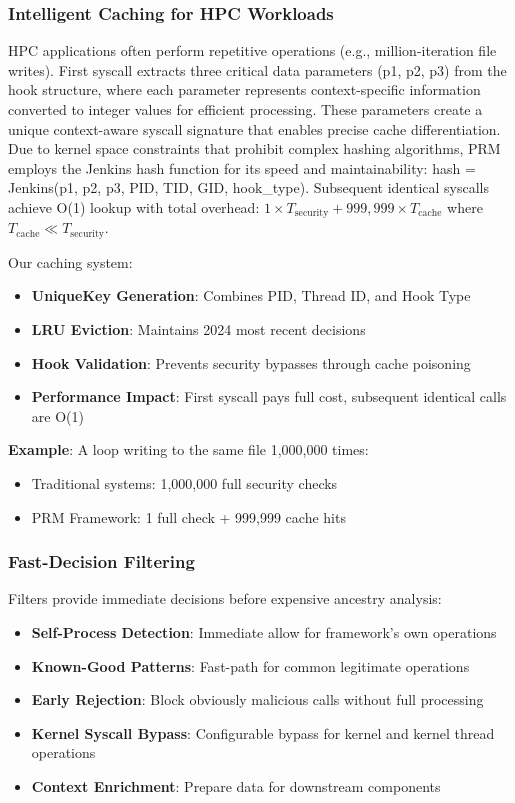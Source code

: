 \documentclass[]{sn-jnl}
\begin{document}
\subsubsection{Intelligent Caching for HPC Workloads}

HPC applications often perform repetitive operations (e.g., million-iteration file
writes). First syscall extracts three critical data parameters (p1, p2, p3) from
the hook structure, where each parameter represents context-specific information
converted to integer values for efficient processing. These parameters create a
unique context-aware syscall signature that enables precise cache differentiation.
Due to kernel space constraints that prohibit complex hashing algorithms, PRM
employs the Jenkins hash function for its speed and maintainability:
hash = Jenkins(p1, p2, p3, PID, TID, GID, hook\_type). Subsequent identical
syscalls achieve O(1) lookup with total overhead:
$1 \times T_{\mathrm{security}} + 999{,}999 \times T_{\mathrm{cache}}$
where $T_{\mathrm{cache}} \ll T_{\mathrm{security}}$.

Our caching system:

\begin{itemize}
\item \textbf{UniqueKey Generation}: Combines PID, Thread ID, and Hook Type
\item \textbf{LRU Eviction}: Maintains 2024 most recent decisions
\item \textbf{Hook Validation}: Prevents security bypasses through cache poisoning
\item \textbf{Performance Impact}: First syscall pays full cost, subsequent
      identical calls are O(1)
\end{itemize}

\textbf{Example}: A loop writing to the same file 1,000,000 times:
\begin{itemize}
\item Traditional systems: 1,000,000 full security checks
\item PRM Framework: 1 full check + 999,999 cache hits
\end{itemize}

\subsubsection{Fast-Decision Filtering}

Filters provide immediate decisions before expensive ancestry analysis:

\begin{itemize}
\item \textbf{Self-Process Detection}: Immediate allow for framework's own operations
\item \textbf{Known-Good Patterns}: Fast-path for common legitimate operations
\item \textbf{Early Rejection}: Block obviously malicious calls without full processing
\item \textbf{Kernel Syscall Bypass}: Configurable bypass for kernel and kernel
      thread operations
\item \textbf{Context Enrichment}: Prepare data for downstream components
\end{itemize}
\end{document}

